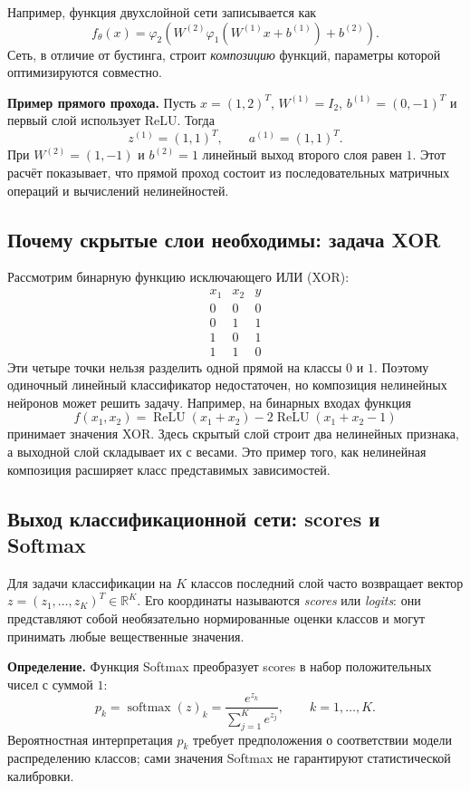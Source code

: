 \documentclass[12pt,a4paper]{article}
\newcommand{\R}{\mathbb{R}}
\begin{document}
Например, функция двухслойной сети записывается как
\[
    f_\theta(x)
    =\varphi_2\!\left(W^{(2)}
      \varphi_1(W^{(1)}x+b^{(1)})+b^{(2)}\right).
\]
Сеть, в отличие от бустинга, строит \emph{композицию} функций,
параметры которой оптимизируются совместно.

\textbf{Пример прямого прохода.} Пусть $x=(1,2)^T$,
$W^{(1)}=I_2$, $b^{(1)}=(0,-1)^T$ и первый слой
использует ReLU. Тогда
\[
    z^{(1)}=(1,1)^T,\qquad a^{(1)}=(1,1)^T.
\]
При $W^{(2)}=(1,-1)$ и $b^{(2)}=1$ линейный выход
второго слоя равен $1$. Этот расчёт показывает,
что прямой проход состоит из последовательных
матричных операций и вычислений нелинейностей.

\subsection{Почему скрытые слои необходимы: задача XOR}

Рассмотрим бинарную функцию исключающего ИЛИ (XOR):
\[
    \begin{array}{c|c|c}
        x_1&x_2&y\\\hline
        0&0&0\\
        0&1&1\\
        1&0&1\\
        1&1&0
    \end{array}
\]
Эти четыре точки нельзя разделить одной прямой на классы
$0$ и $1$. Поэтому одиночный линейный классификатор
недостаточен, но композиция нелинейных нейронов может
решить задачу. Например, на бинарных входах функция
\[
    f(x_1,x_2)
      =\operatorname{ReLU}(x_1+x_2)
       -2\operatorname{ReLU}(x_1+x_2-1)
\]
принимает значения XOR. Здесь скрытый слой строит два
нелинейных признака, а выходной слой складывает их с весами.
Это пример того, как нелинейная композиция расширяет
класс представимых зависимостей.

\subsection{Выход классификационной сети: scores и Softmax}

Для задачи классификации на $K$ классов последний слой
часто возвращает вектор $z=(z_1,\ldots,z_K)^T\in\R^K$.
Его координаты называются \emph{scores} или \emph{logits}:
они представляют собой необязательно нормированные оценки
классов и могут принимать любые вещественные значения.

\textbf{Определение.} Функция Softmax преобразует scores
в набор положительных чисел с суммой $1$:
\begin{equation}
    p_k=\operatorname{softmax}(z)_k
       =\frac{e^{z_k}}{\sum_{j=1}^{K}e^{z_j}},
    \qquad k=1,\ldots,K.
    \label{eq:softmax}
\end{equation}
Вероятностная интерпретация $p_k$ требует предположения
о соответствии модели распределению классов; сами
значения Softmax не гарантируют статистической калибровки.
\end{document}
